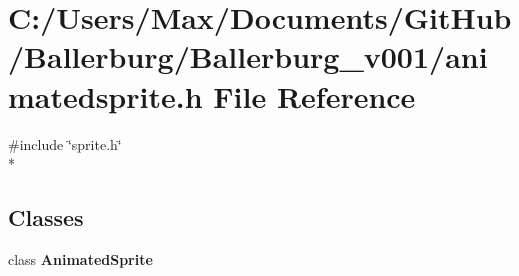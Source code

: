 \section{C\+:/\+Users/\+Max/\+Documents/\+Git\+Hub/\+Ballerburg/\+Ballerburg\+\_\+v001/animatedsprite.h File Reference}
\label{animatedsprite_8h}
{\ttfamily \#include \char`\"{}sprite.\+h\char`\"{}}\\*
\subsection*{Classes}
\begin{DoxyCompactItemize}
\item 
class {\bf Animated\+Sprite}
\end{DoxyCompactItemize}
